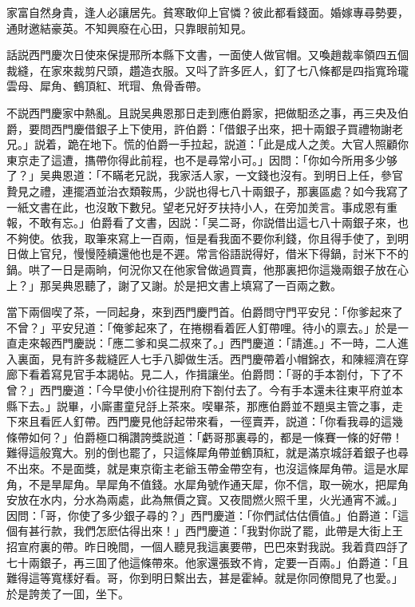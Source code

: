 家富自然身貴，逢人必讓居先。貧寒敢仰上官憐？彼此都看錢面。婚嫁專尋勢要，通財邀結豪英。不知興廢在心田，只靠眼前知見。

話説西門慶次日使來保提邢所本縣下文書，一面使人做官帽。又喚趙裁率領四五個裁縫，在家來裁剪尺頭，趲造衣服。又呌了許多匠人，釘了七八條都是四指寬玲瓏雲母、犀角、鶴頂紅、玳瑁、魚骨香帶。

不説西門慶家中熱亂。且説吴典恩那日走到應伯爵家，把做馹丞之事，再三央及伯爵，要問西門慶借銀子上下使用，許伯爵：「借銀子出來，把十兩銀子買禮物謝老兄。」説着，跪在地下。慌的伯爵一手拉起，説道：「此是成人之羙。大官人照顧你東京走了這遭，㩦帶你得此前程，也不是尋常小可。」因問：「你如今所用多少够了？」吴典恩道：「不瞞老兄説，我家活人家，一文錢也沒有。到明日上任，參官贄見之禮，連擺酒並治衣類鞍馬，少説也得七八十兩銀子，那裏區處？如今我寫了一紙文書在此，也沒敢下數兒。望老兄好歹扶持小人，在旁加羙言。事成恩有重報，不敢有忘。」伯爵看了文書，因説：「吴二哥，你説借出這七八十兩銀子來，也不夠使。依我，取筆來寫上一百兩，恒是看我面不要你利錢，你且得手使了，到明日做上官兒，慢慢陸續還他也是不遲。常言俗語説得好，借米下得鍋，討米下不的鍋。哄了一日是兩晌，何況你又在他家曾做過買賣，他那裏把你這幾兩銀子放在心上？」那吴典恩聽了，謝了又謝。於是把文書上填寫了一百兩之數。

當下兩個喫了茶，一同起身，來到西門慶門首。伯爵問守門平安兒：「你爹起來了不曾？」平安兒道：「俺爹起來了，在捲棚看着匠人釘帶哩。待小的禀去。」於是一直走來報西門慶説：「應二爹和吳二叔來了。」西門慶道：「請進。」不一時，二人進入裏面，見有許多裁縫匠人七手八脚做生活。西門慶帶着小帽錦衣，和陳經濟在穿廊下看着寫見官手本謁帖。見二人，作揖讓坐。伯爵問：「哥的手本劄付，下了不曾？」西門慶道：「今早使小价往提刑府下劄付去了。今有手本還未往東平府並本縣下去。」説畢，小廝畫童兒㧱上茶來。喫畢茶，那應伯爵並不題吳主管之事，走下來且看匠人釘帶。西門慶見他㧱起带來看，一徑賣弄，説道：「你看我尋的這幾條帶如何？」伯爵極口稱讚誇獎説道：「虧哥那裏尋的，都是一條賽一條的好帶！難得這般寬大。别的倒也罷了，只這條犀角帶並鶴頂紅，就是滿京城㧱着銀子也尋不出來。不是面獎，就是東京衛主老爺玉帶金帶空有，也沒這條犀角帶。這是水犀角，不是旱犀角。旱犀角不值錢。水犀角號作通天犀，你不信，取一碗水，把犀角安放在水内，分水為兩處，此為無價之寳。又夜間燃火照千里，火光通宵不滅。」因問：「哥，你使了多少銀子尋的？」西門慶道：「你們試估估價值。」伯爵道：「這個有甚行款，我們怎麽估得出來！」西門慶道：「我對你説了罷，此帶是大街上王招宣府裏的帶。昨日晚間，一個人聽見我這裏要帶，巴巴來對我説。我着賁四㧱了七十兩銀子，再三囬了他這條帶來。他家還張致不肯，定要一百兩。」伯爵道：「且難得這等寬樣好看。哥，你到明日繫出去，甚是霍綽。就是你同僚間見了也愛。」於是誇羙了一囬，坐下。


